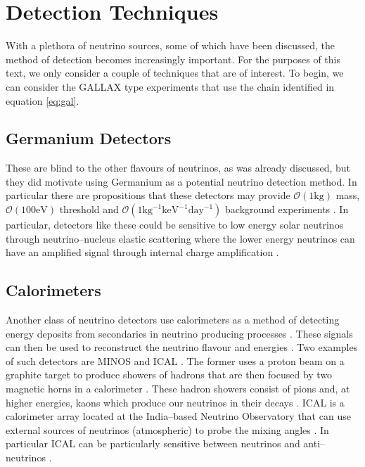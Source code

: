 \section{Detection Techniques}

With a plethora of neutrino sources, some of which have been discussed, the method of detection becomes increasingly important. For the purposes of this text, we only consider a couple of techniques that are of interest. To begin, we can consider the GALLAX type experiments that use the chain identified in equation \ref{eq:gal}.

\subsection{Germanium Detectors}

These are blind to the other flavours of neutrinos, as was already discussed, but they did motivate using Germanium as a potential neutrino detection method. In particular there are propositions that these detectors may provide $\mathcal{O}(1 \text{kg})$ mass, $\mathcal{O}(100 \text{eV})$ threshold and $\mathcal{O}(1 \text{kg}^{-1}\text{keV}^{-1}\text{day}^{-1})$ background experiments \cite{som_germ}. In particular, detectors like these could be sensitive to low energy solar neutrinos through neutrino--nucleus elastic scattering \cite{germ_low} where the lower energy neutrinos can have an amplified signal through internal charge amplification \cite{germ_low}.

\subsection{Calorimeters}

Another class of neutrino detectors use calorimeters as a method of detecting energy deposits from secondaries in neutrino producing processes \cite{minos,ical}. These signals can then be used to reconstruct the neutrino flavour and energies \cite{minos,ical}. Two examples of such detectors are MINOS \cite{minos} and ICAL \cite{ical}. The former uses a proton beam on a graphite target to produce showers of hadrons that are then focused by two magnetic horns in a calorimeter \cite{minos}. These hadron showers consist of pions and, at higher energies, kaons which produce our neutrinos in their decays \cite{minos}. ICAL is a calorimeter array located at the India--based Neutrino Observatory \cite{ical} that can use external sources of neutrinos (atmospheric) to probe the mixing angles \cite{ical}. In particular ICAL can be particularly sensitive between neutrinos and anti--neutrinos \cite{ical}.

